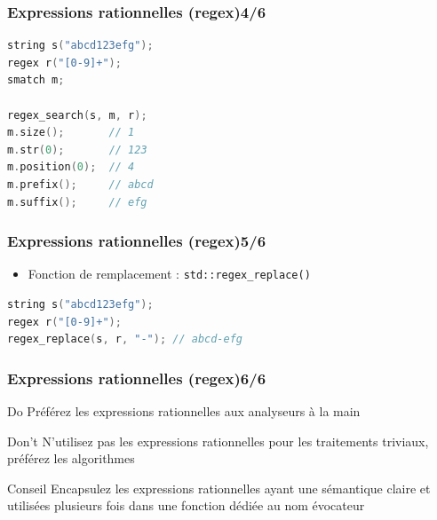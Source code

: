 \documentclass[C++.tex]{subfiles}
\begin{document}
\begin{frame}[fragile]
	\frametitle{Expressions rationnelles (regex)\titlehfill{}4/6}
	\begin{lstlisting}[language=C++]
string s("abcd123efg");
regex r("[0-9]+");
smatch m;

regex_search(s, m, r);
m.size();       // 1
m.str(0);       // 123
m.position(0);  // 4
m.prefix();     // abcd
m.suffix();     // efg\end{lstlisting}
\end{frame}

\begin{frame}[fragile]
	\frametitle{Expressions rationnelles (regex)\titlehfill{}5/6}
	\begin{itemize}
		\item Fonction de remplacement : \lstinline|std::regex_replace()|
	\end{itemize}

	\begin{lstlisting}[language=C++]
string s("abcd123efg");
regex r("[0-9]+");
regex_replace(s, r, "-"); // abcd-efg\end{lstlisting}
\end{frame}

\begin{frame}[fragile]
	\frametitle{Expressions rationnelles (regex)\titlehfill{}6/6}
	\begin{exampleblock}{Do}
		Préférez les expressions rationnelles aux analyseurs \og à la main\fg{}
	\end{exampleblock}

	\begin{alertblock}{Don't}
		N'utilisez pas les expressions rationnelles pour les traitements triviaux, préférez les algorithmes

 		\end{alertblock}

	\begin{block}{Conseil}
		Encapsulez les expressions rationnelles ayant une sémantique claire et utilisées plusieurs fois dans une fonction dédiée au nom évocateur
	\end{block}
\end{frame}
\end{document}
